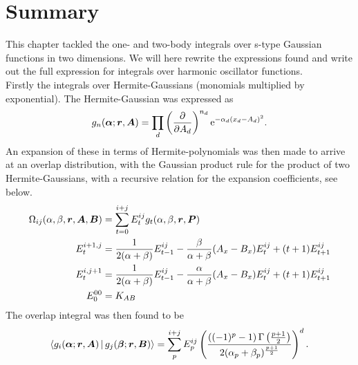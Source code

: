 \section{Summary\label{sec:basis_summary}}
    This chapter tackled the one- and two-body integrals over s-type Gaussian
    functions in two dimensions. We will here rewrite the expressions found
    and write out the full expression for integrals over harmonic oscillator
    functions. \\

    Firstly the integrals over Hermite-Gaussians (monomials multiplied by
    exponential). The Hermite-Gaussian was expressed as 
        \begin{equation}
            g_n(\boldsymbol{{\alpha}};\boldsymbol{{r}},\boldsymbol{{A}}) = \prod_d
            \left(\frac{\mathrm{\partial}}{\mathrm{\partial} A_d}\right)^{n_d} \mathrm{e}^{-\alpha_d(x_d-A_d)^2}.
            \label{eq:HGsumdef}
        \end{equation}
    An expansion of these in terms of Hermite-polynomials was then made to
    arrive at an overlap distribution, with the Gaussian product rule for the
    product of two Hermite-Gaussians, with a recursive relation for the
    expansion coefficients, see  below.
        \begin{equation}
            \begin{aligned}
                \Omega_{ij}(\alpha,\beta,\boldsymbol{{r}},\boldsymbol{{A}},\boldsymbol{{B}}) &=
                \sum\limits^{i+j}_{t=0}
                E^{ij}_tg_t(\alpha,\beta,\boldsymbol{{r}},\boldsymbol{{P}}) \\
                E^{i+1,j}_t &= \frac{1}{2(\alpha + \beta)}E^{ij}_{t-1} -
                \frac{\beta}{\alpha+\beta}(A_x - B_x)E^{ij}_t +
                (t+1)E^{ij}_{t+1} \\
                E^{i,j+1}_t &= \frac{1}{2(\alpha + \beta)}E^{ij}_{t-1} -
                \frac{\alpha}{\alpha+\beta}(A_x - B_x)E^{ij}_t +
                (t+1)E^{ij}_{t+1} \\
                E^{00}_0 &= K_{AB}
            \end{aligned}
            \label{overlapdistdefsum}
        \end{equation}
    The overlap integral was then found to be
        \begin{equation}
            \Braket{g_i(\boldsymbol{{\alpha}};\boldsymbol{{r}},\boldsymbol{{A}}) |
            g_j(\boldsymbol{{\beta}};\boldsymbol{{r}},\boldsymbol{{B}})} = \sum\limits^{i+j}_{p} E^{ij}_{p}
            \left(\frac{\left((-1)^p-1\right)\Gamma\left(\frac{p+1}{2}\right)}
            {2(\alpha_p+\beta_p)^{\frac{p+1}{2}}}\right)^d.
            \label{eq:overlapintdefsum}
        \end{equation}
